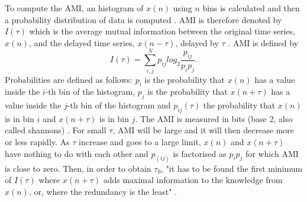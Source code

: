 \documentclass[fleqn,10pt]{wlscirep}
\begin{document}
To compute the AMI, an histogram of $x(n)$ using $n$ bins is calculated
and then a probability distribution of data is computed \cite{kantz2003}.
AMI is therefore denoted by $I(\tau)$ which is the average mutual 
information between the original time series, $x(n)$, and the delayed 
time series, $x(n-\tau)$, delayed by $\tau$ \cite{kabiraj2012}. 
AMI is defined by
\begin{equation}\label{eq:ami}
I(\tau) = \sum_{i,j}^N p_{ij} log_2 \frac{ p_{ij} }{ p_i p_j }.
\end{equation}
Probabilities are defined as follows:
$p_i$ is the probability that $x(n)$ has a value inside the $i$-th bin of 
the histogram, $p_j$ is the probability that $x(n+\tau)$ has a value inside 
the $j$-th bin of the histogram and $p_{ij}(\tau)$ the probability 
that $x(n)$ is in bin $i$ and $x(n+\tau)$ is in bin $j$. The AMI is measured 
in bits (base 2, also called shannons) \cite{kantz2003, nonlinearTseries2016}.
For small $\tau$, AMI will be large and it will then decrease more or 
less rapidly. As $\tau$ increase and goes to a large limit, 
$x(n)$ and $x(n+\tau)$ have nothing to do with each other and $p_(ij)$ is 
factorised as $p_ip_j$ for which AMI is close to zero. Then, in order 
to obtain $\tau_0$, "it has to be found the first minimum of $I(\tau)$ 
where $x(n+\tau)$ adds maximal information to the knowledge from $x(n)$, or,
where the redundancy is the least" \cite{kantz2003}.
\end{document}
